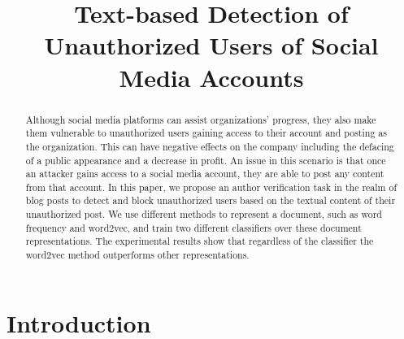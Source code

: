 \documentclass[11pt]{article}
\title{Text-based Detection of Unauthorized Users of Social Media Accounts}
\begin{document}
\maketitle

\begin{abstract}
Although social media platforms can assist organizations' progress, they also make them vulnerable to unauthorized users gaining access to their account and posting as the organization. This can have negative effects on the company including the defacing of a public appearance and a decrease in profit. An issue in this scenario is that once an attacker gains access to a social media account, they are able to post any content from that account. In this paper, we propose an author verification task in the realm of blog posts to detect and block unauthorized users based on the textual content of their unauthorized post. We use different methods to represent a document, such as word frequency and word2vec, and train two different classifiers over these document representations. The experimental results show that regardless of the classifier the word2vec method outperforms other representations.



\end{abstract}

\section{Introduction}
\end{document}
